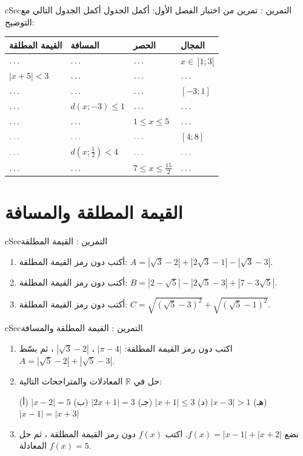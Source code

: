 \documentclass[12pt,a4paper]{article}
\newenvironment{BOX}[2]{\begin{otherlanguage}{english}\begin{arbox}{#1}{#2}}{\end{arbox}\end{otherlanguage}}
\newcounter{exo}
\newenvironment{tamrin}[1]{\stepcounter{exo}\begin{BOX}{cSec}{التمرين \theexo: #1}}{\end{BOX}}
\renewcommand{\dots}{\mathinner{\ldotp\ldotp\ldotp}}
\newcommand{\R}{\mathbb{R}}
\begin{document}
\begin{tamrin}{تمرين من اختبار الفصل الأول: أكمل الجدول}
أكمل الجدول التالي مع التوضيح:
\begin{center}
\renewcommand{\arraystretch}{1.6}
\begin{tabular}{|>{\centering\arraybackslash}p{}|>{\centering\arraybackslash}p{}|>{\centering\arraybackslash}p{}|>{\centering\arraybackslash}p{}|}\hline
\rowcolor{cSec!12}\textbf{القيمة المطلقة} & \textbf{المسافة} & \textbf{الحصر} & \textbf{المجال}\\\hline
$\dots$ & $\dots$ & $\dots$ & $x\in\,]1;3[$\\\hline
$|x+5|<3$ & $\dots$ & $\dots$ & $\dots$\\\hline
$\dots$ & $\dots$ & $\dots$ & $[-3;1]$\\\hline
$\dots$ & $d(x;-3)\leqslant1$ & $\dots$ & $\dots$\\\hline
$\dots$ & $\dots$ & $1\leqslant x\leqslant5$ & $\dots$\\\hline
$\dots$ & $\dots$ & $\dots$ & $[4;8]$\\\hline
$\dots$ & $d\left(x;\frac12\right)<4$ & $\dots$ & $\dots$\\\hline
$\dots$ & $\dots$ & $7\leqslant x\leqslant\frac{15}2$ & $\dots$\\\hline
\end{tabular}
\end{center}
\end{tamrin}

\section{القيمة المطلقة والمسافة}
\begin{tamrin}{القيمة المطلقة}
\begin{enumerate}
\item أكتب دون رمز القيمة المطلقة: $A=\left|\sqrt3-2\right|+\left|2\sqrt3-1\right|-\left|\sqrt3-3\right|$.
\item أكتب دون رمز القيمة المطلقة: $B=\left|2-\sqrt5\right|-\left|2\sqrt5-3\right|+\left|7-3\sqrt5\right|$.
\item أكتب دون رمز القيمة المطلقة: $C=\sqrt{\left(\sqrt5-3\right)^2}+\sqrt{\left(\sqrt5-1\right)^2}$.
\end{enumerate}
\end{tamrin}

\begin{tamrin}{القيمة المطلقة والمسافة}
\begin{enumerate}
\item اكتب دون رمز القيمة المطلقة: $|\pi-4|$ ، $\left|\sqrt3-2\right|$ ، ثم بسّط $A=\left|\sqrt5-2\right|+\left|\sqrt5-3\right|$.
\item حل في $\R$ المعادلات والمتراجحات التالية:\par
(أ) $|x-2|=5$ \qquad (ب) $|2x+1|=3$ \qquad (جـ) $|x+1|\leqslant3$ \qquad (د) $|x-3|>1$ \qquad (هـ) $|x-1|=|x+3|$
\item نضع $f(x)=|x-1|+|x+2|$. اكتب $f(x)$ دون رمز القيمة المطلقة ، ثم حل المعادلة $f(x)=5$.
\end{enumerate}
\end{tamrin}
\end{document}
